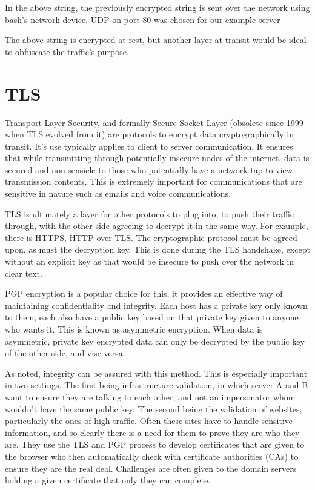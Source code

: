 In the above string, the previously encrypted string is sent over the network using bash's network device. UDP on port 80 was chosen for our example server

The above string is encrypted at rest, but another layer at transit would be ideal to obfuscate the traffic's purpose.


\section{TLS}
Transport Layer Security, and formally Secure Socket Layer (obsolete since 1999 when TLS evolved from it) are protocols to encrypt data cryptographically in transit. It's use typically applies to client to server communication. It ensures that while transmitting through potentially insecure nodes of the internet, data is secured and non sensicle to those who potentially have a network tap to view transmission contents. This is extremely important for communications that are sensitive in nature such as emails and voice communications. \citep{CloudflareTLS}

TLS is ultimately a layer for other protocols to plug into, to push their traffic through, with the other side agreeing to decrypt it in the same way. For example, there is HTTPS, HTTP over TLS. The cryptographic protocol must be agreed upon, as must the decryption key. This is done during the TLS handshake, except without an explicit key as that would be insecure to push over the network in clear text. \citep{CloudflareTLS}

PGP encryption is a popular choice for this, it provides an effective way of maintaining confidentiality and integrity. Each host has a private key only known to them, each also have a public key based on that private key given to anyone who wants it. This is known as asymmetric encryption. When data is asymmetric, private key encrypted data can only be decrypted by the public key of the other side, and vise versa.  

As noted, integrity can be assured with this method. This is especially important in two settings. The first being infrastructure validation, in which server A and B want to ensure they are talking to each other, and not an impersonator whom wouldn't have the same public key. The second being the validation of websites, particularly the ones of high traffic. Often these sites have to handle sensitive information, and so clearly there is a need for them to prove they are who they are. They use the TLS and PGP process to develop certificates that are given to the browser who then automatically check with certificate authorities (CAs) to ensure they are the real deal. Challenges are often given to the domain servers holding a given certificate that only they can complete.

